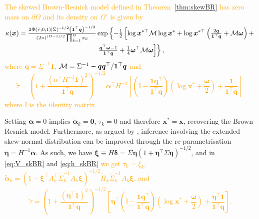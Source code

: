 \documentclass[12pt]{article}
\newcommand{\PZ}{\textcolor{orange}}
\begin{document}
\PZ{\begin{proposition}
\label{prop:AngDesn_skBR}
The skewed Brown-Resnick model defined in Theorem~\ref{thm:skewBR} has zero mass on $\partial\Omega$ and its density on $\Omega^\circ$ is given by
%
\begin{multline}
\label{eq:h_skBR}
\kappa(\bm x) ={\textstyle{2\Phi(\tilde{\tau};0,1)| \Sigma |^{-1/2} \left( \bm 1^\top \bm q\right)^{-1/2}\over\left( 2\pi \right)^{(D-1)/2}\prod_{k=1}^D x_k}}\exp \left\{ -{\textstyle{1\over2}} \left[ \log \bm x^{*\top} {\mathcal M} \log \bm x^* + \log \bm x^{*\top} \left( {\textstyle{2 \bm q\over\bm 1^\top \bm q}} + {\mathcal M}{\bm\omega}\right) + \right.\right. \\ 
\left.\left. {\textstyle{\bm q^\top{\bm \omega} - 1\over\bm 1 ^\top \bm q}} + {\textstyle{1\over4}}\bm\omega^\top{\mathcal M}\bm\omega \right]\right\},
\end{multline}%
where $\bm q = \Sigma^{-1} \bm 1$, ${\mathcal M} = \Sigma^{-1} - \bm q \bm q^\top / \bm 1^\top \bm q$ and  
$$\tilde{\tau}=\left(1 + \frac{\left(\alpha^\top H^{-1}\bm 1\right)^2}{\bm 1^\top \bm q} \right)^{-1/2} \bm\alpha^\top H^{-1}\left[\left(\mathbb{I} - \frac{\bm 1\bm q^\top}{\bm 1^\top \bm q}\right)\left(\log \bm x^* + \frac{{\bm\omega}}{2}\right) +  \frac{\bm 1}{{\bm 1}^\top\bm q}  \right].$$
where $\mathbb{I}$ is the identity matrix. 
\end{proposition}
}

Setting $\bm \alpha = 0$ implies $\tilde{\bm \alpha}_k = \bm 0$, $\tau_k=0$ and therefore $\bm x^* = \bm x$, recovering the Brown-Resnick model. Furthermore, as argued by \citet[][Section~5.2]{Azzalini:2013}, inference involving the extended skew-normal distribution can be improved through the re-parametrisation $\bm \eta = H^{-1} \bm \alpha$. As such, we have $\bm \xi \equiv H \bm \delta = \Sigma \bm \eta \left( 1+\bm \eta^\top \Sigma \bm \eta\right)^{-1/2} $, and in \eqref{eq:V_skBR} and \eqref{eq:h_skBR} 
\PZ{we get $\tau_k = \xi_k$, $\tilde{\bm\alpha}_k = \left(1-\bm\xi^\top A_k^\top\tilde\Sigma_k^{-1} A_k \bm\xi \right)^{-1/2} \tilde H_k\tilde\Sigma_k^{-1}A_k \bm\xi$, and $$\tilde{\tau}=\left(1 + \frac{\left(\bm\eta^\top\bm 1\right)^2}{\bm 1^\top \bm q} \right)^{-1/2} \left[\bm\eta^\top\left(\mathbb I - \frac{\bm 1\bm q^\top}{\bm 1^\top \bm q}\right)\left(\log \bm x^* + \frac{{\bm\omega}}{2}\right) +  \frac{\bm\eta^\top\bm 1}{{\bm 1}^\top\bm q}  \right].$$ 
}
\end{document}
